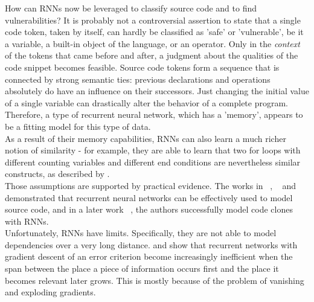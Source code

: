 \documentclass[
a4paper,
pagesize,
pdftex,
12pt,
twoside, %
BCOR=5mm, %
ngerman,
fleqn,
final,
]{scrartcl}
\begin{document}
	How can RNNs now be leveraged to classify source code and to find vulnerabilities? It is probably not a controversial assertion to state that a single code token, taken by itself, can hardly be classified as 'safe' or 'vulnerable', be it a variable, a built-in object of the language, or an operator. Only in the \textit{context} of the tokens that came before and after, a judgment about the qualities of the code snippet becomes feasible. Source code tokens form a sequence that is connected by strong semantic ties: previous declarations and operations absolutely do have an influence on their successors. Just changing the initial value of a single variable can drastically alter the behavior of a complete program. Therefore, a type of recurrent neural network, which has a 'memory', appears to be a fitting model for this type of data.\\
	As a result of their memory capabilities, RNNs can also learn a much richer notion of similarity - for example, they are able to learn that two for loops with different counting variables and different end conditions are nevertheless similar constructs, as described by \cite{Allamanis.2018}. \\
	Those assumptions are supported by practical evidence. The works in ~\cite{White.2015}, ~\cite{Dam.2016b} and ~\cite{Dam.2016} demonstrated that recurrent neural networks can be effectively used to model source code, and in a later work ~\cite{White.2016}, the authors successfully model code clones with RNNs.\\
	Unfortunately, RNNs have limits. Specifically, they are not able to model dependencies over a very long distance. \cite{Hochreiter.1991} and \cite{Bengio.1994} show that recurrent networks with gradient descent of an error criterion become increasingly inefficient when the span between the place a piece of information occurs first and the place it becomes relevant later grows. This is mostly because of the problem of vanishing and exploding gradients.\\
	
\end{document}
